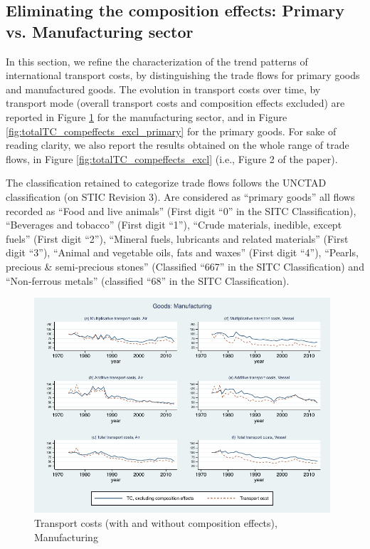 \documentclass[11pt,twoside, authoryear]{elsarticle}
\begin{document}
\setcounter{table}{0}
\renewcommand{\thetable}{C.\arabic{table}}

\setcounter{figure}{0}
\renewcommand{\thefigure}{C.\arabic{figure}}

\subsection{Eliminating the composition effects: Primary vs. Manufacturing sector} \label{sec_oa:comp-effects}

In this section, we refine the characterization of the trend patterns of international transport costs, by distinguishing the trade flows for primary goods and manufactured goods. The evolution in transport costs over time, by transport mode (overall transport costs and composition effects excluded) are reported in Figure \ref{fig:totalTC_compeffects_excl_manuf} for the manufacturing sector, and in Figure \ref{fig:totalTC_compeffects_excl_primary} for the primary goods. For sake of reading clarity, we also report the results obtained on the whole range of trade flows, in Figure \ref{fig:totalTC_compeffects_excl} (i.e., Figure 2 of the paper).


The classification retained to categorize trade flows follows the UNCTAD classification (on STIC Revision 3). Are considered as ``primary goods'' all flows recorded as ``Food and live animals'' (First digit ``0'' in the SITC Classification), ``Beverages and tobacco'' (First digit ``1''), ``Crude materials, inedible, except fuels'' (First digit ``2''), ``Mineral fuels, lubricants and related materials'' (First digit ``3''), ``Animal and vegetable oils, fats and waxes'' (First digit ``4''), ``Pearls, precious \& semi-precious stones'' (Classified ``667'' in the SITC Classification) and ``Non-ferrous metals'' (classified ``68'' in the SITC Classification).


\begin{figure}[htbp]
\caption{Transport costs (with and without composition effects), Manufacturing}
\label{fig:totalTC_compeffects_excl_manuf}
\begin{center}
\includegraphics[height=8cm]
{graph_composition_manuf.pdf}
\end{center}
\end{figure}
\end{document}
